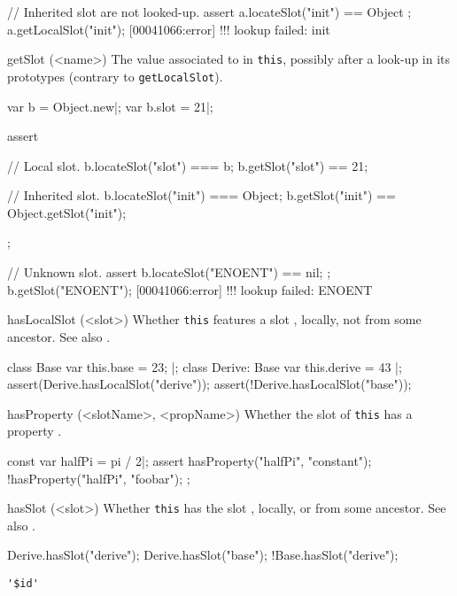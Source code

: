 \begin{urbiscriptapi}
\begin{urbiscript}
// Inherited slot are not looked-up.
assert { a.locateSlot("init") == Object };
a.getLocalSlot("init");
[00041066:error] !!! lookup failed: init
\end{urbiscript}

\item[getSlot](<name>)%
  The value associated to  in \lstinline|this|, possibly
  after a look-up in its prototypes (contrary to
  \lstinline|getLocalSlot|).
\begin{urbiscript}
var b = Object.new|;
var b.slot = 21|;

assert
{
  // Local slot.
  b.locateSlot("slot") === b;
  b.getSlot("slot") == 21;

  // Inherited slot.
  b.locateSlot("init") === Object;
  b.getSlot("init") == Object.getSlot("init");
};

// Unknown slot.
assert { b.locateSlot("ENOENT") == nil; };
b.getSlot("ENOENT");
[00041066:error] !!! lookup failed: ENOENT
\end{urbiscript}

\item[hasLocalSlot](<slot>)%
  Whether \lstinline|this| features a slot , locally, not
  from some ancestor.  See also .
\begin{urbiscript}
class Base         { var this.base = 23; } |;
class Derive: Base { var this.derive = 43 } |;
assert(Derive.hasLocalSlot("derive"));
assert(!Derive.hasLocalSlot("base"));
\end{urbiscript}

\item[hasProperty](<slotName>, <propName>)%
  Whether the slot  of \lstinline|this| has a property
  .
\begin{urbiscript}
const var halfPi = pi / 2|;
assert
{
  hasProperty("halfPi", "constant");
  !hasProperty("halfPi", "foobar");
};
\end{urbiscript}

\item[hasSlot](<slot>)%
  Whether \lstinline|this| has the slot , locally, or from
  some ancestor.  See also .

\begin{urbiassert}
Derive.hasSlot("derive");
Derive.hasSlot("base");
!Base.hasSlot("derive");
\end{urbiassert}

\item \lstinline|'$id'|\\ %


\end{urbiscriptapi}
